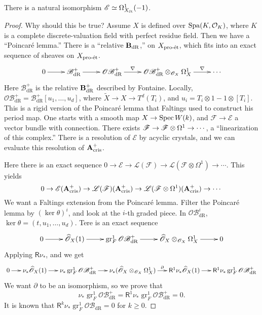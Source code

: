 \begin{lemma}
There is a natural isomorphism $\mathscr E\simeq \Omega_{X_{\textnormal{\'et}}}^1(-1)$. 
\end{lemma}
\begin{proof}
Why should this be true? Assume $X$ is defined over $\operatorname{Spa}(K,\mathcal{O}_K)$, where $K$ is 
a complete discrete-valuation field with perfect residue field. Then we have a 
``Poincar\'e lemma.'' There is a ``relative $\mathbf{B}_\textnormal{dR}$,'' on $X_{\textnormal{pro-\'et}}$, which fits into 
an exact sequence of sheaves on $X_{\textnormal{pro-\'et}}$. 
\[\xymatrix{
  0 \ar[r] 
    & \mathscr B_\text{dR}^+ \ar[r] 
    & \mathscr{OB}_\text{dR}^+ \ar[r]^-\nabla 
    & \mathscr{OB}_\text{dR}^+ \otimes_{\sO_X} \Omega_X^1 \ar[r]^-\nabla 
    & \cdots
}\]
Here $\mathscr B_\text{dR}^+$ is the relative $\mathbf{B}_\textnormal{dR}^+$ described by Fontaine. Locally, 
$\mathscr{OB}_\text{dR}^+=\mathscr{B}_\text{dR}^+[u_1,\dots,u_d]$, where 
$\widetilde X\to X \to T^d(T_i)$, and 
$u_i=T_i\otimes 1 - 1\otimes [T_i]$. This is a rigid version of the Poincar\'e 
lemma that Faltings used to construct his period map. One starts with a smooth 
map $X\to \operatorname{Spec} W(k)$, and $\mathscr F\to \mathscr E$ a vector bundle with connection. 
There exists $\mathscr{F}\to \mathscr{F}\otimes \Omega^1 \to \cdots$, a ``linearization of this 
complex.'' There is a resolution of $\mathscr E$ by acyclic crystals, and we can evaluate 
this resolution of $\mathbf{A}_\textnormal{cris}^+$. 

Here there is an exact sequence $0\to \mathscr E\to \mathscr L(\mathscr F) \to \mathscr L(\mathscr F\otimes \Omega^1) \to \cdots$. This yields 
\[
  0 \to \mathscr E(\mathbf{A}_\textnormal{cris}^+) \to \mathscr L(\mathscr F)(\mathbf{A}_\textnormal{cris}^+) \to \mathscr L(\mathscr F\otimes \Omega^1)(\mathbf{A}_\textnormal{cris}^+) \to \cdots 
\]
We want a Faltings extension from the Poincar\'e lemma. Filter the Poincar\'e lemma 
by $(\ker\theta)^i$, and look at the $i$-th graded piece. In $\mathscr{OB}_\text{dR}^i$, 
$\ker\theta=(t,u_1,\dots,u_d)$. Tere is an exact sequence 
\[\xymatrix{
  0 \ar[r] 
    & \widehat\sO_X(1) \ar[r] 
    & \operatorname{gr}_F^1 \mathscr{OB}_\text{dR}^+ \ar[r] 
    & \widehat\sO_X\otimes_{\sO_X} \Omega_X^1 \ar[r] 
    & 0
}\]
Applying $\mathsf R \nu_\ast$, and we get 
\[\xymatrix@=0.5cm{
  0 \ar[r] 
    & \nu_\ast \widehat\sO_X(1) \ar[r] 
    & \nu_\ast \operatorname{gr}_F^1 \mathscr{OB}_\text{dR}^+ \ar[r] 
    & \nu_\ast(\widehat\sO_X\otimes_{\sO_X}\Omega_X^1) \ar[r]^-\partial 
    & \mathsf R^1\nu_\ast \widehat\sO_X(1) \ar[r] 
    & \mathsf R^1 \nu_\ast \operatorname{gr}_F^1 \mathscr{OB}_\text{dR}^+
}\]
We want $\partial$ to be an isomorphism, so we prove that 
\[
  \nu_\ast \operatorname{gr}_F^1 \mathscr{OB}_\text{dR}^+  = \mathsf R^1 \nu_\ast \operatorname{gr}_F^1 \mathscr{OB}_\text{dR}^+ = 0 .
\]
It is known that 
$\mathsf R^k \nu_\ast \operatorname{gr}_F^1 \mathscr{OB}_\text{dR}=0$ 
for $k\geqslant 0$. 
\end{proof}

